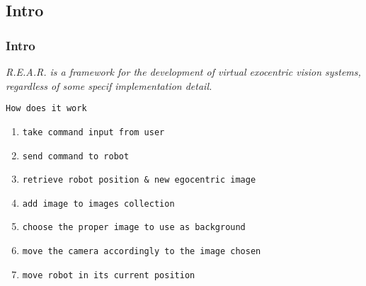\subsection{Intro}
\frame
{
  \frametitle{Intro}
  
  \emph{\textit{R.E.A.R.} is a framework for the
    development of \textit{virtual exocentric vision systems},
    regardless of some specif implementation detail.}
  \pause
  
  \vskip15pt


  \begin{block} {\alert{\texttt{How does it work}}}
    \begin{enumerate}

      \footnotesize

      \pause
      \item \texttt{take command input from user}
      \pause
      \item \texttt{send command to robot}
      \pause
      \item \texttt{retrieve robot position \& new egocentric image}
      \pause
      \item \texttt{add image to images collection}
      \pause
      \item \texttt{choose the proper image to use as background}
      \pause
      \item \texttt{move the camera accordingly to the image chosen}
      \pause
      \item \texttt{move robot in its current position}
      
    \end{enumerate}
      
  \end{block}
      
}

